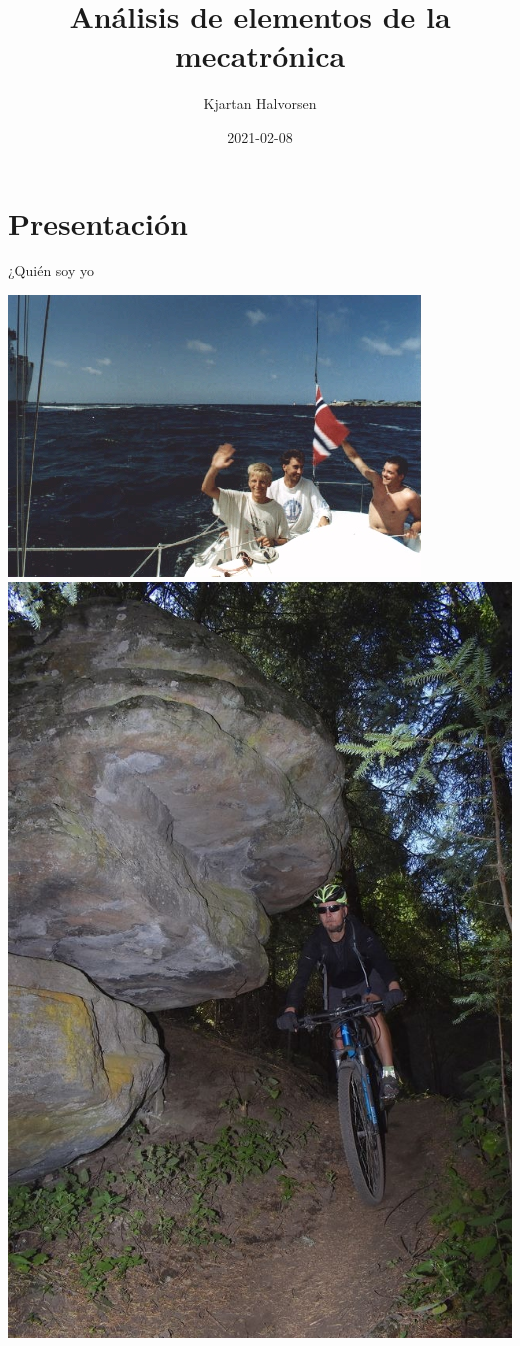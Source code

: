 \documentclass[presentation,aspectratio=169]{beamer}
\author{Kjartan Halvorsen}
\date{2021-02-08}
\title{Análisis de elementos de la mecatrónica}
\begin{document}
\maketitle

\section{Presentación}
\label{sec:org63c16a5}
\begin{frame}[label={sec:orgcaf0661}]{¿Quién soy yo}
\begin{center}
\includegraphics[height=0.6\textheight]{../../figures/red-heat-2.jpeg}
\includegraphics[height=0.6\textheight]{../../figures/mtb.jpeg}
\end{center}
\end{frame}
\end{document}
